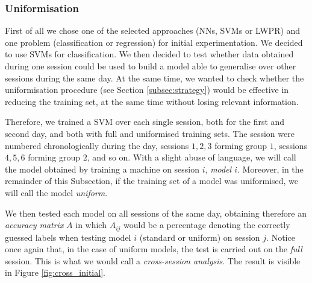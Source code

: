 %

\subsubsection{Uniformisation}

First of all we chose one of the selected approaches (NNs, SVMs or
LWPR) and one problem (classification or regression) for initial
experimentation. We decided to use SVMs for classification. We then
decided to test whether data obtained during one session could be used
to build a model able to generalise over other sessions during the
same day. At the same time, we wanted to check whether the
uniformisation procedure (see Section \ref{subsec:strategy}) would be
effective in reducing the training set, at the same time without
losing relevant information.

Therefore, we trained a SVM over each single session, both for the
first and second day, and both with full and uniformised training
sets. The session were numbered chronologically during the day,
sessions $1,2,3$ forming group $1$, sessions $4,5,6$ forming group
$2$, and so on. With a slight abuse of language, we will call the
model obtained by training a machine on session $i$, \emph{model
$i$}. Moreover, in the remainder of this Subsection, if the training
set of a model was uniformised, we will call the model \emph{uniform}.

We then tested each model on all sessions of the same day, obtaining
therefore an \emph{accuracy matrix} $A$ in which $A_{ij}$ would be a
percentage denoting the correctly guessed labels when testing model
$i$ (standard or uniform) on session $j$. Notice once again that, in
the case of uniform models, the test is carried out on the \emph{full}
session. This is what we would call a \emph{cross-session analysis}.
The result is visible in Figure \ref{fig:cross_initial}.

